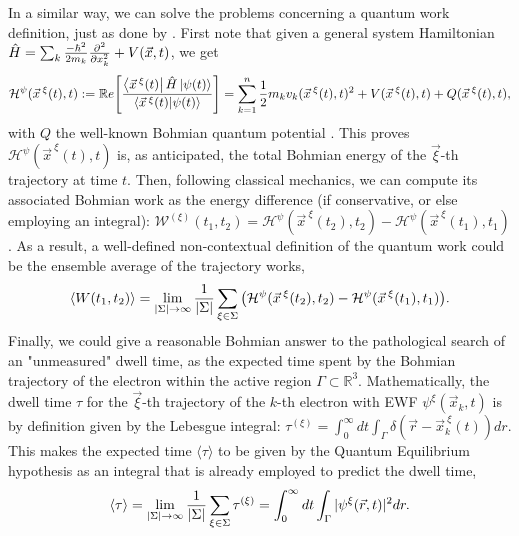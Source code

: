 \documentclass[11pt, a4paper]{article} %
\newcommand{\R}{\mathbb{R}} %
\begin{document}
 In a similar way, we can solve the problems concerning a quantum work definition, just as done by \cite{work1, work2}. First note that given a general system Hamiltonian $\hat{H}=\sum_k \frac{-\hbar^2}{2m_k}\pdv[2]{}{x_k}+V(\vec{x},t)$, we get
\begin{equation}
\mathcal{H}^\psi(\vec{x}^{\:\xi}(t),t) := \mathbb{R}e\qty[ \frac{\bra{\vec{x}^{\:\xi}(t)}\hat{H}\ket{\psi(t)}}{\bra{\vec{x}^{\:\xi}(t)}\ket{\psi(t)}} ] = \sum_{k=1}^n\frac{1}{2}m_kv_k(\vec{x}^{\:\xi}(t),t)^2+V(\vec{x}^{\:\xi}(t),t)+Q(\vec{x}^{\:\xi}(t),t),
\end{equation}
with $Q$ the well-known Bohmian quantum potential \cite{Holland, Durr, JordiXavier}. This proves $\mathcal{H}^\psi(\vec{x}^{\:\xi}(t),t)$ is, as anticipated, the total Bohmian energy of the $\vec{\xi}$-th trajectory at time $t$. Then, following classical mechanics, we can compute its associated Bohmian work as the energy difference (if conservative, or else employing an integral): $\mathcal{W}^{(\xi)}(t_1,t_2)= \mathcal{H}^\psi(\vec{x}^{\:\xi}(t_2),t_2)-\mathcal{H}^\psi(\vec{x}^{\:\xi}(t_1),t_1)$. As a result, a well-defined non-contextual definition of the quantum work could be the ensemble average of the trajectory works,
\begin{equation}
\langle W(t_1,t_2)\rangle = \lim_{|\Sigma|\rightarrow \infty}\frac{1}{|\Sigma|} \sum_{\xi\in\Sigma} \qty(\mathcal{H}^\psi(\vec{x}^{\:\xi}(t_2),t_2)-\mathcal{H}^\psi(\vec{x}^{\:\xi}(t_1),t_1)).
\end{equation}
Finally, we could give a reasonable Bohmian answer to the pathological search of an "unmeasured" dwell time, as the expected time spent by the Bohmian trajectory of the electron within the active region $\Gamma\subset \R^3$. Mathematically, the dwell time $\tau$ for the $\vec{\xi}$-th trajectory of the $k$-th electron with EWF $\psi^\xi(\vec{x}_k,t)$ is by definition given by the Lebesgue integral: $\tau^{( \xi)}= \int_{0}^\infty  dt \int_\Gamma \delta(\vec{r}-\vec{x}_k^{\:\xi}(t)) dr$. This makes the expected time $\langle \tau\rangle$ to be given by the Quantum Equilibrium hypothesis as an integral that is already employed to predict the dwell time,\vspace{-0.05cm}
\begin{equation}
\langle \tau \rangle = \lim_{|\Sigma|\rightarrow \infty}\frac{1}{|\Sigma|} \sum_{\xi\in\Sigma} \tau^{(\xi)} = \int_{0}^\infty dt \int_\Gamma |\psi^\xi(\vec{r},t)|^2dr.\vspace{-0.14cm}
\end{equation}
\end{document}

